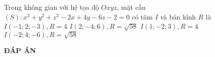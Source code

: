 \begin{ex}%
Trong không gian với hệ tọa độ $Oxyz$, mặt cầu $(S): x^2 + y^2 + z^2 - 2x + 4y - 6z - 2 = 0$ có tâm $I$ và bán kính $R$ là
\choice
{$I(-1; 2; -3), R = 4$}
{$I(2; -4; 6), R = \sqrt{58}$}
{\True $I(1; -2; 3), R = 4$}
{$I(-2; 4; -6), R = \sqrt{58}$}
\end{ex}




\newpage
\begin{center}
	\textbf{ĐÁP ÁN}
\end{center}
\begin{multicols}{10}
	
\end{multicols}


